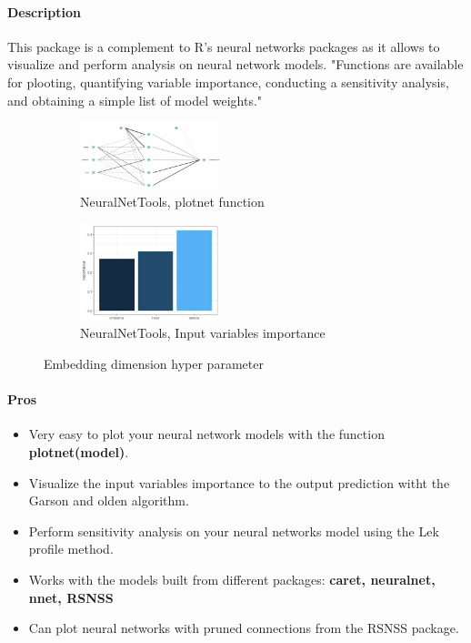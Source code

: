 \documentclass[letter]{article}\usepackage[]{graphicx}\usepackage[]{color}
\begin{document}
\paragraph{Description}
This package is a complement to R's neural networks packages as it allows to visualize and perform analysis on neural network models. "Functions are available for plooting, quantifying variable importance, conducting a sensitivity analysis, and obtaining a simple list of model weights."
\begin{figure}[H]
  \begin{subfigure}{0.5\textwidth}
    \centering\includegraphics[width=0.45\textwidth]{figure/plotnet.png}
    \caption{NeuralNetTools, plotnet function}
  \end{subfigure}
  \begin{subfigure}{0.5\textwidth}
    \centering\includegraphics[width=0.45\textwidth]{figure/garson_algorithm.png}
    \caption{NeuralNetTools, Input variables importance}
  \end{subfigure}
    \caption{Embedding dimension hyper parameter}
\end{figure}

\paragraph{Pros}
\begin{itemize}
\item Very easy to plot your neural network models with the function \textbf{plotnet(model)}.
\item Visualize the input variables importance to the output prediction witht the Garson and olden algorithm.
\item Perform sensitivity analysis on your neural networks model using the Lek profile method.
\item Works with the models built from different packages: \textbf{caret, neuralnet, nnet, RSNSS}
\item Can plot neural networks with pruned connections from the RSNSS package.
\end{itemize}
\end{document}
